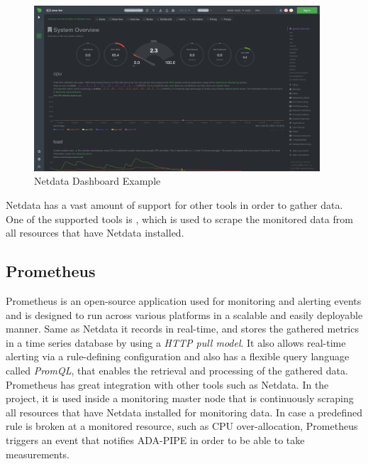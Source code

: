 \documentclass{article}
\begin{document}
            \begin{figure}[h!]
                \centering
                \includegraphics[width=0.95\textwidth]{figures/netdata.png}
                \caption{Netdata Dashboard Example}
                \label{fig:netdata-dashboard}
            \end{figure}
            Netdata has a vast amount of support for other tools in order to gather data. 
            One of the supported tools is , which is used to scrape the monitored data from all resources that have Netdata installed.


        \subsection{Prometheus}
        \label{sec:prometheus-monitoring}
            Prometheus \cite{prometheusOverviewPrometheus} is an open-source application used for monitoring and alerting events and is designed to run across various platforms in a scalable and easily deployable manner.
            Same as Netdata it records in real-time, and stores the gathered metrics in a time series database by using a \emph{HTTP pull model}. It also allows real-time alerting via a rule-defining configuration and also has a flexible query language called \emph{PromQL}, that enables the retrieval and processing of the gathered data. Prometheus has great integration with other tools such as Netdata.
            In the project, it is used inside a monitoring master node that is continuously scraping all resources that have Netdata installed for monitoring data. In case a predefined rule is broken at a monitored resource, such as CPU over-allocation, Prometheus triggers an event that notifies ADA-PIPE in order to be able to take measurements.
            
\end{document}
